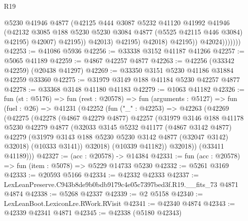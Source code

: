 \begin{lexlean}{R19}
\begin{coremodule}
                                @5230
                                @41946
                                @4877
                                (@42125
                                  @444
                                  @3087
                                  @5232
                                  @41120
                                  @41992
                                  @41946
                                  (@42132
                                    @3085
                                    @188
                                    @5230
                                    @5230
                                    @3084
                                    @4877
                                    (@5525 @42115 @446 @3084)
                                    @42195)
                                  @42007)
                                @42195))
                            @42013)
                          @42195)
                        @42018)
                      @42195))
                  @42024)))))))
@42253 := @41086 @5936
@42256 := @33338 @3152 @41187 @41266
@42257 := @5065 @41189
@42259 := @4867 @42257 @4877
@42263 := @42256 (@33342 @42259) (@20438 @41297)
@42269 := @33350 @3151 @5230 @41186 @31884 @42259 @33360
@42275 := @31979 @3149 @188 @41184 @5230 @42257 @4877
@42278 := @33368 @3148 @41180 @41183
@42279 := @1063 @41182
@42326 := fun (st : @5176) =>
  fun (rest : @20578) =>
  fun (arguments : @5127) =>
  fun (fuel : @26) =>
  @41231
    (@42252
      (fun ("_" : @42253) =>
      @42263
        (@42269
          (@42275
            (@42278
              (@4867 @42279 @4877)
              @42257
              (@31979
                @3146
                @188
                @41178
                @5230
                @42279
                @4877
                (@32033
                  @3145
                  @5232
                  @41177
                  (@4867 @3142 @4877)
                  @42279
                  (@31979 @3143 @188 @5230 @5230 @3142 @4877 (@32047 @3142) @32018)
                  (@10333 @3141))
                @32018)
              (@10339 @41182))
            @32018))
        (@33411 @41189)))
@42327 := (acc : @20578) -> @14384
@42331 := fun (acc : @20578) => fun (item : @5078) => @5229 @14733 @5230
@42332 := @5261 @3169
@42333 := @20593 @5166
@42334 := @42332 @42333
@42337 := LexLeanPreserve.C943b8de9b0bdb9179c4e05c7397bed3f.R19.__fits_73 @4871 @4874
@42338 := @5268 @42337
@42339 := @2 @5158
@42340 := LexLeanBoot.LexiconLre.RWork.RVisit
@42341 := @42340 @4874
@42343 := @42339 @42341 @4871
@42345 := @42338 (@5180 @42343)

\end{coremodule}
\end{lexlean}
